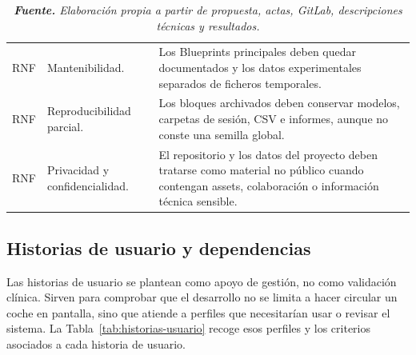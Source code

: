\begin{table}[htbp]
\begin{tabularx}{0.96\textwidth}{L{1.7cm}L{4.2cm}>{\raggedright\arraybackslash}X}
RNF & Mantenibilidad. & Los Blueprints principales deben quedar documentados y los datos experimentales separados de ficheros temporales.\\
RNF & Reproducibilidad parcial. & Los bloques archivados deben conservar modelos, carpetas de sesión, CSV e informes, aunque no conste una semilla global.\\
RNF & Privacidad y confidencialidad. & El repositorio y los datos del proyecto deben tratarse como material no público cuando contengan assets, colaboración o información técnica sensible.\\
\bottomrule
\end{tabularx}
\caption*{\textit{\textbf{Fuente.} Elaboración propia a partir de propuesta, actas, GitLab, descripciones técnicas y resultados.}}
\end{table}

\subsection{Historias de usuario y dependencias}

Las historias de usuario se plantean como apoyo de gestión, no como validación clínica. Sirven para comprobar que el desarrollo no se limita a hacer circular un coche en pantalla, sino que atiende a perfiles que necesitarían usar o revisar el sistema. La Tabla~\ref{tab:historias-usuario} recoge esos perfiles y los criterios asociados a cada historia de usuario.

